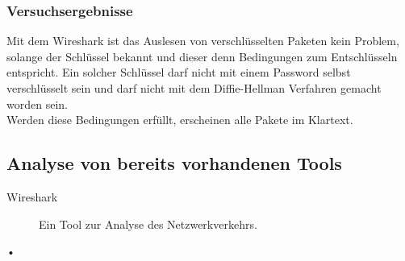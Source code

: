	\subsubsection{Versuchsergebnisse}
	Mit dem Wireshark ist das Auslesen von verschlüsselten Paketen kein Problem, solange der Schlüssel bekannt und dieser denn Bedingungen zum Entschlüsseln entspricht. Ein solcher Schlüssel darf nicht mit einem Password selbst verschlüsselt sein und darf nicht mit dem Diffie-Hellman Verfahren gemacht worden sein.\\
	Werden diese Bedingungen erfüllt, erscheinen alle Pakete im Klartext. 
	
	\subsection{Analyse von bereits vorhandenen Tools} %
	\begin{description}
		\item[Wireshark] Ein Tool zur Analyse des Netzwerkverkehrs.
		\item[•]
	\end{description}